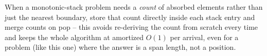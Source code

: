 \begin{takeawaybox}
When a monotonic-stack problem needs a \emph{count} of absorbed elements
rather than just the nearest boundary, store that count directly inside
each stack entry and merge counts on pop -- this avoids re-deriving the
count from scratch every time and keeps the whole algorithm at amortized
$O(1)$ per arrival, even for a problem (like this one) where the answer is
a span length, not a position.
\end{takeawaybox}
